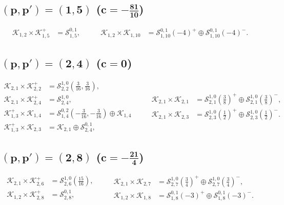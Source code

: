 \documentclass[a4paper,reqno,12pt]{report}
\theoremstyle{definition}
\numberwithin{equation}{section}
\newcommand{\Kac}[1]{\mathcal{K}_{#1}}       %
\newcommand{\Stag}[2]{\mathcal{S}_{#1}^{#2}} %
\newcommand{\fuse}{\mathbin{\times}}                                            %
\theoremstyle{plain}
\begin{document}
\subsection*{$\bm{(p,p') = (1,5)}$ ($\bm{c=-\frac{81}{10}}$)}

\begin{equation}
\begin{aligned}
  \Kac{1,2}\fuse \Kac{1,5}^+ &=  \Stag{1,5}{0,1},
\end{aligned}
\qquad
\begin{aligned}
  \Kac{1,2}\fuse \Kac{1,10} &= \Stag{1,10}{0,1}(-4)^+ \oplus \Stag{1,10}{0,1}(-4)^-.
\end{aligned}
\end{equation}

\subsection*{$\bm{(p,p') = (2,4)}$ ($\bm{c=0}$)}

\begin{equation}
\begin{aligned}
  \Kac{2,1}\fuse \Kac{2,2}^+ &= \Stag{2,2}{1,0}(\tfrac{3}{16},\tfrac{3}{16}), \\
  \Kac{2,1}\fuse \Kac{2,4}^+ &= \Stag{2,4}{1,0}, \\
  \Kac{1,3}^+\fuse \Kac{1,4} &= \Stag{1,4}{0,2}(-\tfrac{3}{16},-\tfrac{3}{16}) \oplus \Kac{1,4}\\
  \Kac{1,3}^+\fuse \Kac{2,3} &= \Kac{2,1} \oplus \Stag{2,4}{0,1},
\end{aligned}
\qquad
\begin{aligned}
  \Kac{2,1}\fuse \Kac{2,1} &= \Stag{2,1}{1,0}(\tfrac{3}{8})^+ \oplus \Stag{2,1}{1,0}(\tfrac{3}{8})^-, \\
  \Kac{2,1}\fuse \Kac{2,3} &= \Stag{2,3}{1,0}(\tfrac{1}{2})^+ \oplus \Stag{2,3}{1,0}(\tfrac{1}{2})^-.
\end{aligned}
\end{equation}

\subsection*{$\bm{(p,p') = (2,8)}$ ($\bm{c=-\frac{21}{4}}$)}

\begin{equation}
\begin{aligned}
  \Kac{2,1}\fuse \Kac{2,6}^+ &= \Stag{2,6}{1,0}(\tfrac{15}{16}), \\
  \Kac{1,2}\fuse \Kac{2,8}^+ &= \Stag{2,8}{0,1},
\end{aligned}
\qquad
\begin{aligned}
  \Kac{2,1}\fuse \Kac{2,7} &= \Stag{2,7}{1,0}(\tfrac{3}{4})^+ \oplus \Stag{2,7}{1,0}(\tfrac{3}{4})^-, \\
  \Kac{1,2}\fuse \Kac{1,8} &= \Stag{1,8}{0,1}(-3)^+ \oplus \Stag{1,8}{0,1}(-3)^-.
\end{aligned}
\end{equation}
\end{document}
